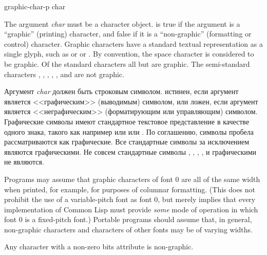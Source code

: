 \begin{defun}[Function]
graphic-char-p char

The argument \emph{char} must be a character object.
 is true if the argument is a ``graphic'' (printing)
character, and false if it is a ``non-graphic'' (formatting or control)
character.  Graphic characters have a standard textual representation
as a single glyph, such as  or \cdf{*} or \cdf{=}.
By convention, the space character is considered to be graphic.
Of the standard characters
all but  are graphic.
The semi-standard characters
, , , , ,
and  are not graphic.

Аргумент \emph{char} должен быть строковым символом.
 истинен, если аргумент является <<графическим>> (выводимым)
символом, или ложен, если аргумент является <<неграфическим>> (форматирующим или
управляющим) символом. Графические символы имеют стандартное текстовое
представление в качестве одного знака, такого как например  или \cdf{*}
или \cdf{=}.
По соглашению, символы пробела рассматриваются как графические.
Все стандартные символы за исключением  являются
графическими.
Не совсем стандартные символы
, ,
, ,
 и   графическими не являются.

Programs may assume that
graphic characters of font 0 are all of the same width
when printed, for example, for purposes of columnar
formatting.  (This does not prohibit the use of a variable-pitch font
as font 0, but merely implies that every implementation of Common Lisp
must provide \emph{some} mode of operation in which font 0 is
a fixed-pitch font.)
Portable programs should assume that, in general,
non-graphic characters and characters of
other fonts may be of varying widths.

Any character with a non-zero bits attribute is non-graphic.
\end{defun}


